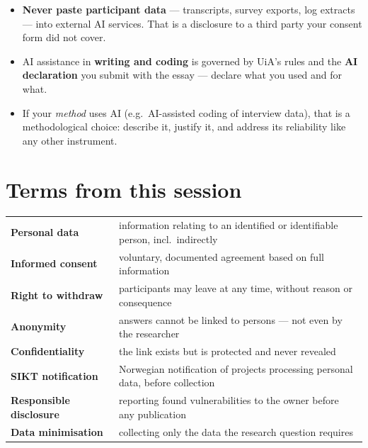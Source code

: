 \documentclass[11pt,a4paper,british,twoside=false,headings=small,chapterprefix=false,numbers=noenddot]{scrbook}
\begin{document}
\begin{center}\small
\begin{itemize}\setlength{\itemsep}{0.5em}
    \item \textbf{Never paste participant data} --- transcripts, survey
          exports, log extracts --- into external AI services. That is a
          disclosure to a third party your consent form did not cover.
    \item AI assistance in \textbf{writing and coding} is governed by
          UiA's rules and the \textbf{AI declaration} you submit with
          the essay --- declare what you used and for what.
    \item If your \emph{method} uses AI (e.g.\ AI-assisted coding of
          interview data), that is a methodological choice: describe it,
          justify it, and address its reliability like any other instrument.
  \end{itemize}
\end{center}


\section*{Terms from this session}
\begin{center}\small
\footnotesize
  \renewcommand{\arraystretch}{1.2}
  \begin{tabular}{@{}p{3.8cm}p{9.7cm}@{}}
    \toprule
    \textbf{Personal data} & information relating to an identified or identifiable person, incl.\ indirectly\\
    \textbf{Informed consent} & voluntary, documented agreement based on full information\\
    \textbf{Right to withdraw} & participants may leave at any time, without reason or consequence\\
    \textbf{Anonymity} & answers cannot be linked to persons --- not even by the researcher\\
    \textbf{Confidentiality} & the link exists but is protected and never revealed\\
    \textbf{SIKT notification} & Norwegian notification of projects processing personal data, before collection\\
    \textbf{Responsible disclosure} & reporting found vulnerabilities to the owner before any publication\\
    \textbf{Data minimisation} & collecting only the data the research question requires\\
    \bottomrule
  \end{tabular}
\end{center}
\end{document}
